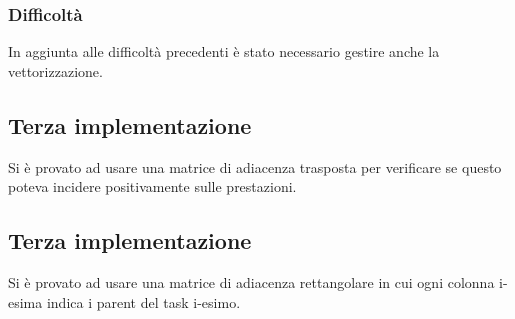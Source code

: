 \documentclass{article}
\begin{document}
            \subsubsection{Difficoltà}
                In aggiunta alle difficoltà precedenti è stato necessario gestire anche la vettorizzazione.

        \subsection{Terza implementazione}
            Si è provato ad usare una matrice di adiacenza trasposta per verificare se questo poteva incidere positivamente sulle prestazioni.
            
        \subsection{Terza implementazione}
            Si è provato ad usare una matrice di adiacenza rettangolare in cui ogni colonna i-esima indica i parent del task i-esimo.
\end{document}
